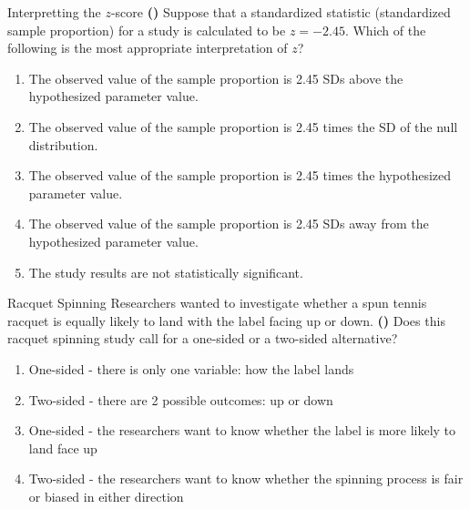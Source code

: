 \documentclass[13pt]{beamer}
\newcounter{count}
\newcommand{\question}{ \textbf{(\decimal{count})} \stepcounter{count}}
\begin{document}
\begin{frame}{Interpretting the $z$-score}
\question Suppose that a standardized statistic (standardized sample proportion) for a study is calculated to be $z = -2.45$. Which of the following is the most appropriate interpretation of $z$?
\begin{enumerate}[A]
	\item The observed value of the sample proportion is 2.45 SDs above the hypothesized parameter value.
    \item The observed value of the sample proportion is 2.45 times the SD of the null distribution.
    \item The observed value of the sample proportion is 2.45 times the hypothesized parameter value.
  	\item The observed value of the sample proportion is 2.45 SDs away from the hypothesized parameter value. %
    \item The study results are not statistically significant.
\end{enumerate}

\end{frame}

\begin{frame}{Racquet Spinning}
Researchers wanted to investigate whether a spun tennis racquet is equally
likely to land with the label facing up or down.
\question Does this racquet spinning study call for a one-sided or a two-sided alternative?
\begin{enumerate}[A]
	\item One-sided - there is only one variable: how the label lands
  \item Two-sided - there are 2 possible outcomes: up or down
  \item One-sided - the researchers want to know whether the label is more likely to land face up
  \item Two-sided - the researchers want to know whether the spinning process is fair or biased in either direction %
\end{enumerate}
\end{frame}

\end{document}
